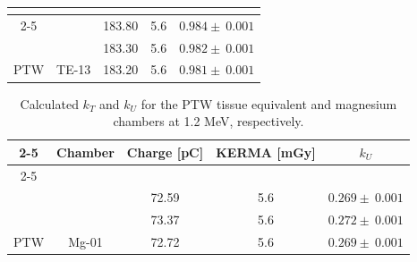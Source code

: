 \begin{table}[!h]
\begin{tabular}{ccccc}
\multicolumn{1}{|c|}{\cellcolor[HTML]{FEEFD1}}                      &                                 &                                         &                                         &                                                 \\ \cline{2-5} 
\multicolumn{1}{|c|}{\cellcolor[HTML]{FEEFD1}}                      &                                 & 183.80                                  & 5.6                                     & \multicolumn{1}{c|}{$0.984 \pm \:0.001$}                      \\
\multicolumn{1}{|c|}{\cellcolor[HTML]{FEEFD1}}                      &                                 & 183.30                                  & 5.6                                     & \multicolumn{1}{c|}{$0.982 \pm \:0.001$}                      \\
\multicolumn{1}{|c|}{\multirow{-7}{*}{\cellcolor[HTML]{FEEFD1}PTW}} & \multirow{-3}{*}{TE-13}         & 183.20                                  & 5.6                                     & \multicolumn{1}{c|}{$0.981 \pm \:0.001$}                      \\ \hline
\end{tabular}

\end{table}

\begin{table}[!h]
\centering
\begin{tabular}{ccccc}
\cline{2-5}
\multicolumn{1}{c|}{}                                               & \cellcolor[HTML]{D9D9D9}Chamber & \cellcolor[HTML]{D9D9D9}Charge {[}\unit{\pico\coulomb}{]} & \cellcolor[HTML]{D9D9D9}KERMA {[}\unit{\milli\gray}{]} & \multicolumn{1}{c|}{\cellcolor[HTML]{D9D9D9}$k_U$} \\ \cline{2-5} 
                                                                    &                                 &                                         &                                         &                                                 \\ \hline
\multicolumn{1}{|c|}{\cellcolor[HTML]{FEEFD1}}                      &                                 & 72.59                                   & 5.6                                     & \multicolumn{1}{c|}{$0.269 \pm \:0.001$}                      \\
\multicolumn{1}{|c|}{\cellcolor[HTML]{FEEFD1}}                      &                                 & 73.37                                   & 5.6                                     & \multicolumn{1}{c|}{$0.272 \pm \:0.001$}                      \\
\multicolumn{1}{|c|}{\multirow{-3}{*}{\cellcolor[HTML]{FEEFD1}PTW}} & \multirow{-3}{*}{Mg-01}         & 72.72                                   & 5.6                                     & \multicolumn{1}{c|}{$0.269 \pm \:0.001$}                      \\ \hline
\end{tabular}
\caption{Calculated $k_T$ and $k_U$ for the PTW tissue equivalent and magnesium chambers at 1.2 \unit{\mega\electronvolt}, respectively.}
\end{table}

